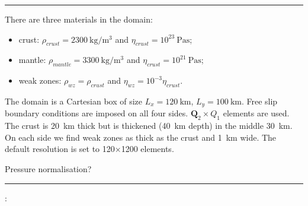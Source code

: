 \par\noindent\rule{\textwidth}{0.4pt}




There are three materials in the domain:
\begin{itemize}
\item crust: $\rho_{crust}=2300~\si{\kg\per\cubic\meter}$ and $\eta_{crust}=10^{23}~\si{\pascal\second}$;
\item mantle: $\rho_{mantle}=3300~\si{\kg\per\cubic\meter}$ and $\eta_{crust}=10^{21}~\si{\pascal\second}$;
\item weak zones: $\rho_{wz}=\rho_{crust}$ and $\eta_{wz}=10^{-3}\eta_{crust}$.
\end{itemize}
The domain is a Cartesian box of size $L_x=120~\si{\km}$, $L_y=100~\si{\km}$.
Free slip boundary conditions are imposed on all four sides. ${\bm Q}_2 \times Q_1$ elements are used.
The crust is 20~\si{\km} thick but is thickened (40~\si{\km} depth) in the middle 30~\si{\km}.
On each side we find weak zones as thick as the crust and 1~\si{\km} wide. 
The default resolution is set to 120$\times$1200 elements.

Pressure normalisation?

























\par\noindent\rule{\textwidth}{0.4pt}

\vspace{.5cm}

\begin{center}
\end{center}

\vspace{.5cm}

\Literature:\\


